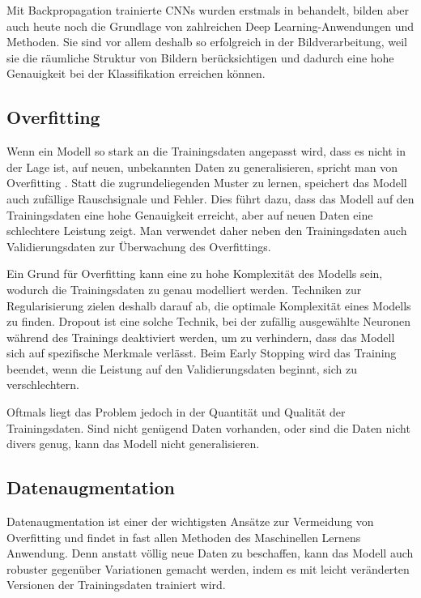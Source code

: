 Mit Backpropagation trainierte CNNs wurden erstmals in \parencite{LeCun1989cnnbackprop} behandelt, bilden aber auch heute noch die Grundlage von zahlreichen Deep Learning-Anwendungen und Methoden. Sie sind vor allem deshalb so erfolgreich in der Bildverarbeitung, weil sie die räumliche Struktur von Bildern berücksichtigen und dadurch eine hohe Genauigkeit bei der Klassifikation erreichen können.

\subsection{Overfitting} \label{sec:overfitting}

Wenn ein Modell so stark an die Trainingsdaten angepasst wird, dass es nicht in der Lage ist, auf neuen, unbekannten Daten zu generalisieren, spricht man von Overfitting \parencite{Goodfellow2016deeplearning}. Statt die zugrundeliegenden Muster zu lernen, speichert das Modell auch zufällige Rauschsignale und Fehler. Dies führt dazu, dass das Modell auf den Trainingsdaten eine hohe Genauigkeit erreicht, aber auf neuen Daten eine schlechtere Leistung zeigt. Man verwendet daher neben den Trainingsdaten auch Validierungsdaten zur Überwachung des Overfittings.

Ein Grund für Overfitting kann eine zu hohe Komplexität des Modells sein, wodurch die Trainingsdaten zu genau modelliert werden. Techniken zur Regularisierung zielen deshalb darauf ab, die optimale Komplexität eines Modells zu finden. Dropout \parencite{Srivastava2014dropout} ist eine solche Technik, bei der zufällig ausgewählte Neuronen während des Trainings deaktiviert werden, um zu verhindern, dass das Modell sich auf spezifische Merkmale verlässt. Beim Early Stopping wird das Training beendet, wenn die Leistung auf den Validierungsdaten beginnt, sich zu verschlechtern.

Oftmals liegt das Problem jedoch in der Quantität und Qualität der Trainingsdaten. Sind nicht genügend Daten vorhanden, oder sind die Daten nicht divers genug, kann das Modell nicht generalisieren.

\subsection{Datenaugmentation} \label{sec:data-augmentation}

Datenaugmentation ist einer der wichtigsten Ansätze zur Vermeidung von Overfitting und findet in fast allen Methoden des Maschinellen Lernens Anwendung. Denn anstatt völlig neue Daten zu beschaffen, kann das Modell auch robuster gegenüber Variationen gemacht werden, indem es mit leicht veränderten Versionen der Trainingsdaten trainiert wird.

